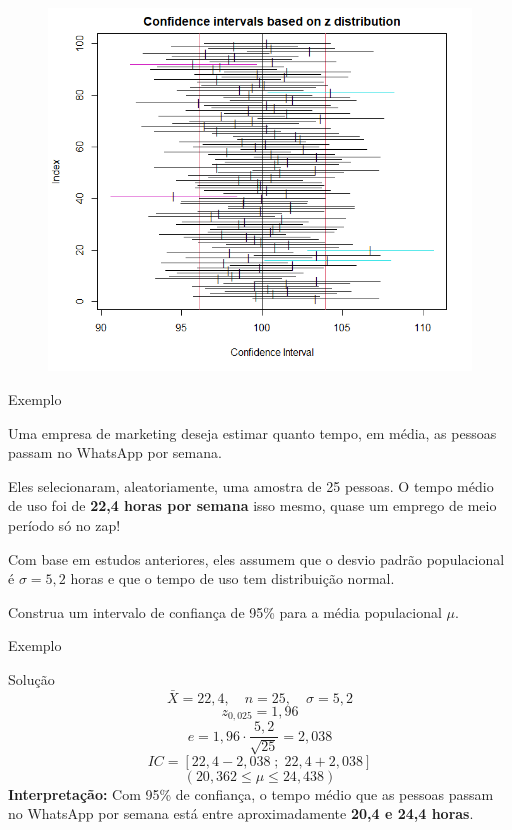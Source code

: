 \documentclass[14pt,aspectratio=1610]{beamer}
\begin{document}
	
	\begin{frame}{}
		\begin{block}{}
			\justifying
			\begin{figure}
				\centering
				\includegraphics[scale=0.6]{figs/IC3.png}
			\end{figure}
		\end{block}
	\end{frame}
	
	\begin{frame}{Exemplo}
		\begin{block}{}
			\justifying
			Uma empresa de marketing deseja estimar quanto tempo, em m\'edia, as pessoas passam no WhatsApp por semana.
			
			Eles selecionaram, aleatoriamente, uma amostra de 25 pessoas. O tempo m\'edio de uso foi de \textbf{22,4 horas por semana} \textendash{} isso mesmo, quase um emprego de meio per\'iodo s\'o no zap!
			
			Com base em estudos anteriores, eles assumem que o desvio padr\~ao populacional \'e $\sigma = 5,2$ horas e que o tempo de uso tem distribui\c{c}\~ao normal.
			
			Construa um intervalo de confian\c{c}a de 95\% para a m\'edia populacional $\mu$.
		\end{block}
		
	\end{frame}
	
	\begin{frame}{Exemplo}
	
		\begin{block}{Solu\c{c}\~ao}
			\[
			\bar{X} = 22,4, \quad n = 25, \quad \sigma = 5,2
			\]
			\[
			z_{0,025} = 1,96
			\]
			\[
			e = 1,96 \cdot \frac{5,2}{\sqrt{25}} = 2,038
			\]
			\[
			IC = \left[22,4 - 2,038 \; ; \; 22,4 + 2,038\right]
			\]
			\[
			(20,362 \leq \mu \leq 24,438)
			\]
			\textbf{Interpreta\c{c}\~ao:} Com 95\% de confian\c{c}a, o tempo m\'edio que as pessoas passam no WhatsApp por semana est\'a entre aproximadamente \textbf{20,4 e 24,4 horas}.
		\end{block}
	\end{frame}
	
\end{document}
